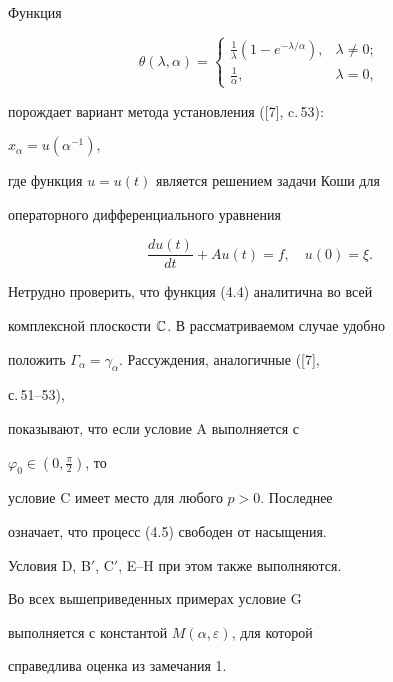 \begin{exam}


Функция 


\begin{equation}


\theta(\lambda,\alpha)=


\begin{cases}


\frac{1}{\lambda}(1-e^{-\lambda/\alpha}), & \lambda\ne0;\\


\frac{1}{\alpha}, & \lambda=0,


\end{cases}


\end{equation}


порождает вариант метода установления ([7], c.\,53): 


$x_\alpha=u(\alpha^{-1})$,


где функция $u=u(t)$ является решением задачи Коши для 


операторного дифференциального уравнения


\begin{equation}


\frac{d u(t)}{d t}+A u(t)=f,\quad u(0)=\xi.


\end{equation}


Нетрудно проверить, что функция (4.4) аналитична во всей 


комплексной плоскости $\Bbb C$. В рассматриваемом случае удобно 


положить $\Gamma_\alpha=\gamma_\alpha$. Рассуждения, аналогичные ([7], 


с.\,51--53),


показывают, что если условие A выполняется с 


$\varphi_0\in(0,\frac{\pi}{2})$, то 


условие C имеет место для любого $p>0$. Последнее 


означает, что процесс (4.5) свободен от насыщения. 


Условия D, B$'$, C$'$, E--H при этом также выполняются.


\end{exam}





\begin{note}


Во всех вышеприведенных примерах условие G 


выполняется с константой $M(\alpha,\varepsilon)$, для которой 


справедлива оценка из замечания 1.


\end{note}





